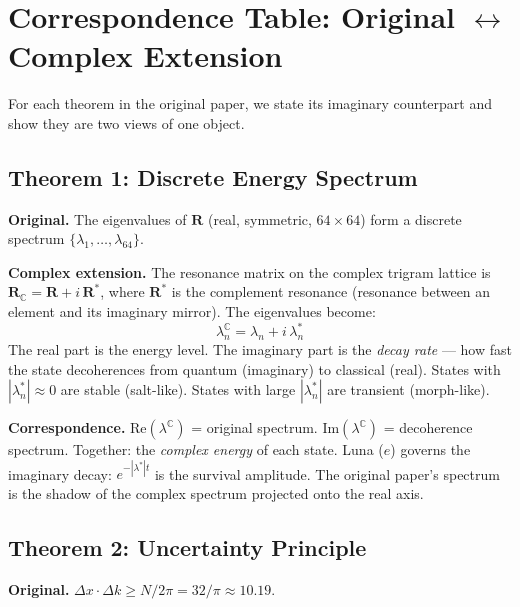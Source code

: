 \documentclass[12pt,a4paper]{article}
\theoremstyle{definition}
\theoremstyle{remark}
\newcommand{\CC}{\mathbb{C}}
\begin{document}
\section{Correspondence Table: Original $\leftrightarrow$ Complex Extension}
\label{sec:correspondence}

For each theorem in the original paper, we state its imaginary counterpart
and show they are two views of one object.

\bigskip

\subsection{Theorem 1: Discrete Energy Spectrum}

\noindent\textbf{Original.}
The eigenvalues of $\mathbf{R}$ (real, symmetric, $64 \times 64$)
form a discrete spectrum $\{\lambda_1, \ldots, \lambda_{64}\}$.

\medskip\noindent\textbf{Complex extension.}
The resonance matrix on the complex trigram lattice is
$\mathbf{R}_\CC = \mathbf{R} + i\,\mathbf{R}^*$, where $\mathbf{R}^*$
is the complement resonance (resonance between an element and its
imaginary mirror). The eigenvalues become:
\begin{equation}
  \lambda_n^\CC = \lambda_n + i\,\lambda_n^*
\end{equation}
The real part is the energy level. The imaginary part is the
\emph{decay rate} --- how fast the state decoherences from quantum
(imaginary) to classical (real). States with $|\lambda_n^*| \approx 0$
are stable (salt-like). States with large $|\lambda_n^*|$ are transient
(morph-like).

\medskip\noindent\textbf{Correspondence.}
$\mathrm{Re}(\lambda^\CC)$ = original spectrum. $\mathrm{Im}(\lambda^\CC)$
= decoherence spectrum. Together: the \emph{complex energy} of each state.
Luna ($e$) governs the imaginary decay: $e^{-|\lambda^*| t}$ is the
survival amplitude. The original paper's spectrum is the shadow of the
complex spectrum projected onto the real axis.

\bigskip

\subsection{Theorem 2: Uncertainty Principle}

\noindent\textbf{Original.}
$\Delta x \cdot \Delta k \geq N / 2\pi = 32/\pi \approx 10.19$.
\end{document}
